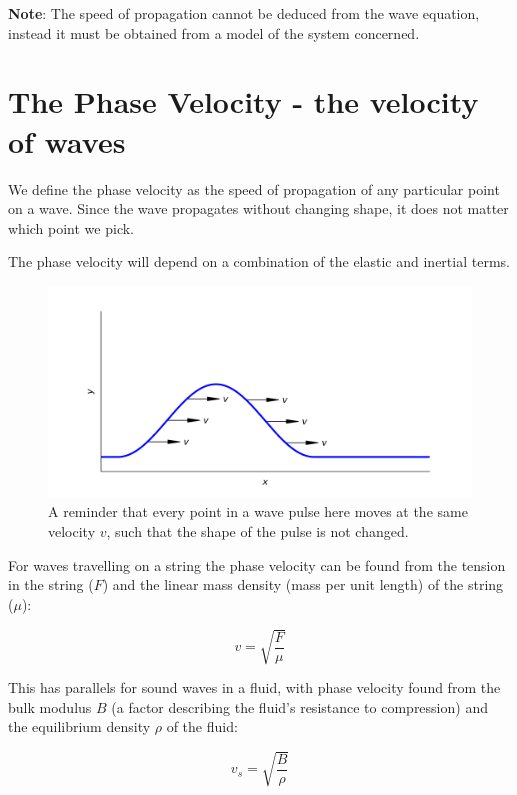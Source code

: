 \documentclass[
]{book}
\begin{document}
\textbf{Note}: The speed of propagation cannot be deduced from the wave equation, instead it must be obtained from a model of the system concerned.

\hypertarget{sec-ch6-phasevelocity}{%
\section{The Phase Velocity - the velocity of waves}\label{sec-ch6-phasevelocity}}

We define the phase velocity as the speed of propagation of any particular point on a wave. Since the wave propagates without changing shape, it does not matter which point we pick.

The phase velocity will depend on a combination of the elastic and inertial terms.

\begin{figure}

{\centering \includegraphics[width=0.7\linewidth]{visualisations/ch6-phasevelocity1} 

}

\caption{A reminder that every point in a wave pulse here moves at the same velocity $v$, such that the shape of the pulse is not changed.}\label{fig:ch6-phasevelocity1}
\end{figure}

For waves travelling on a string the phase velocity can be found from the tension in the string (\(F\)) and the linear mass density (mass per unit length) of the string (\(\mu\)):

\begin{equation}
v = \sqrt{\frac{F}{\mu}}
\end{equation}

This has parallels for sound waves in a fluid, with phase velocity found from the bulk modulus \(B\) (a factor describing the fluid's resistance to compression) and the equilibrium density \(\rho\) of the fluid:

\begin{equation}
v_s = \sqrt{\frac{B}{\rho}}
\end{equation}
\end{document}
